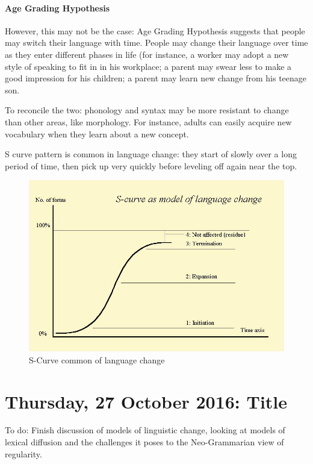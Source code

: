 \documentclass{exam}
\begin{document}
\paragraph{Age Grading Hypothesis} However, this may not be the case: Age Grading Hypothesis suggests that people may switch their language with time. People may change their language over time as they enter different phases in life (for instance, a worker may adopt a new style of speaking to fit in in his workplace; a parent may swear less to make a good impression for his children; a parent may learn new change from his teenage son.

To reconcile the two: phonology and syntax may be more resistant to change than other areas, like morphology. For instance, adults can easily acquire new vocabulary when they learn about a new concept. 

S curve pattern is common in language change: they start of slowly over a long period of time, then pick up very quickly before leveling off again near the top. 

\begin{figure} [h!]
    \centering
    \includegraphics[scale=.4]{s_curve.JPG}
    \caption{S-Curve common of language change}
    \label{fig:my_label}
\end{figure}



\section*{Thursday, 27 October 2016: Title}

To do: Finish discussion of models of linguistic change, looking at models of lexical diffusion and the challenges it poses to the Neo-Grammarian view of regularity. 
\end{document}
